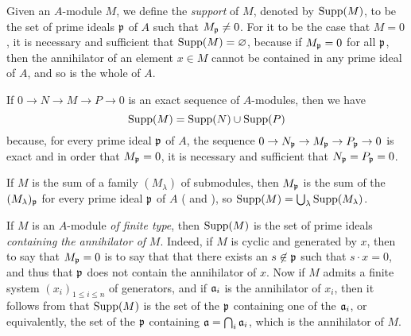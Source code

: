 \begin{env}[1.7.1]
\label{0.1.7.1}
Given an $A$-module $M$, we define the \emph{support} of $M$, denoted by ${\mathop{\mathrm{Supp}}\nolimits}(M)$, to be the set of prime ideals $\mathfrak{p}$ of $A$ such that $M_\mathfrak{p}\neq 0$.
For it to be the case that $M=0$, it is necessary and sufficient that ${\mathop{\mathrm{Supp}}\nolimits}(M)=\varnothing$, because if $M_\mathfrak{p}=0$ for all $\mathfrak{p}$, then the annihilator of an element $x\in M$ cannot be contained in any prime ideal of $A$, and so is the whole of $A$.
\end{env}

\begin{env}[1.7.2]
\label{0.1.7.2}
If $0\to N\to M\to P\to 0$ is an exact sequence of $A$-modules, then we have
\[
  {\mathop{\mathrm{Supp}}\nolimits}(M)={\mathop{\mathrm{Supp}}\nolimits}(N)\cup{\mathop{\mathrm{Supp}}\nolimits}(P)
\]
because, for every prime ideal $\mathfrak{p}$ of $A$, the sequence $0\to N_\fk{p}\to M_\fk{p}\to P_\fk{p}\to 0$ is exact  and in order that $M_\mathfrak{p}=0$, it is necessary and sufficient that $N_\mathfrak{p}=P_\mathfrak{p}=0$.
\end{env}

\begin{env}[1.7.3]
\label{0.1.7.3}
If $M$ is the sum of a family $(M_\lambda)$ of submodules, then $M_\mathfrak{p}$ is the sum of the $(M_\lambda)_\mathfrak{p}$ for every prime ideal $\mathfrak{p}$ of $A$ ( and ), so ${\mathop{\mathrm{Supp}}\nolimits}(M)=\bigcup_\lambda{\mathop{\mathrm{Supp}}\nolimits}(M_\lambda)$.
\end{env}

\begin{env}[1.7.4]
\label{0.1.7.4}
If $M$ is an $A$-module \emph{of finite type}, then ${\mathop{\mathrm{Supp}}\nolimits}(M)$ is the set of prime ideals \emph{containing the annihilator of} $M$.
Indeed, if $M$ is cyclic and generated by $x$, then to say that $M_\mathfrak{p}=0$ is to say that that there exists an $s\not\in\mathfrak{p}$ such that $s\cdot x=0$, and thus that $\mathfrak{p}$ does not contain the annihilator of $x$.
Now if $M$ admits a finite system $(x_i)_{1\leq i\leq n}$ of generators, and if $\mathfrak{a}_i$ is the annihilator of $x_i$, then it follows from  that ${\mathop{\mathrm{Supp}}\nolimits}(M)$ is
the set of the $\mathfrak{p}$ containing one of the $\mathfrak{a}_i$, or equivalently, the set of the $\mathfrak{p}$ containing $\mathfrak{a}=\bigcap_i\mathfrak{a}_i$, which is the annihilator of $M$.
\end{env}

